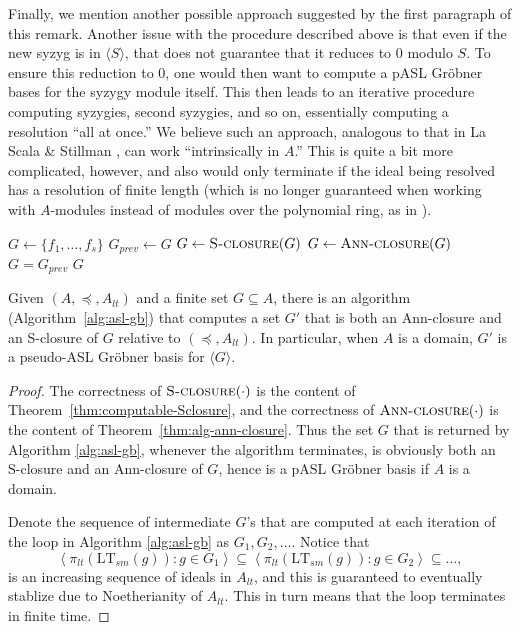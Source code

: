 \documentclass[11pt,reqno]{amsart}
\newcommand{\suchthat}{:}
\newcommand{\ideal}[1]{\left\langle#1\right\rangle}
\newcommand{\gb}{Gr\"{o}bner }
\newcommand{\ltsm}{\text{LT}_{sm}}
\theoremstyle{definition}
\numberwithin{equation}{section}
\begin{document}
\begin{remark}
Finally, we mention another possible approach suggested by the first paragraph of this remark. Another issue with the procedure described above is that even if the new syzyg is in $\langle S \rangle$, that does not guarantee that it reduces to $0$ modulo $S$. To ensure this reduction to $0$, one would then want to compute a pASL Gröbner bases for the syzygy module itself. This then leads to an iterative procedure computing syzygies, second syzygies, and so on, essentially computing a resolution ``all at once.'' We believe such an approach, analogous to that in La Scala \& Stillman \cite{LaScalaStillman}, can work ``intrinsically in $A$.'' This is quite a bit more complicated, however, and also would only terminate if the ideal being resolved has a resolution of finite length (which is no longer guaranteed when working with $A$-modules instead of modules over the polynomial ring, as in \cite{LaScalaStillman}). 
\end{remark}

\begin{algorithm}[h]
\caption{Computes a pseudo-ASL \gb of an ideal with respect to any $(A, \preceq, A_{lt})$}
\label{alg:asl-gb}
\begin{algorithmic}[1]
\medskip
{}
\State $G \gets \{f_1, \ldots, f_s\}$
\Repeat
\State $G_{prev} \gets G$
\State $G \gets \textsc{S-closure}(G)$
\State $G \gets \textsc{Ann-closure}(G)$
\Until $G = G_{prev}$
\State \Return $G$
\EndProcedure
\end{algorithmic}
\end{algorithm}

\begin{theorem} \label{thm:asl-gb-alt}
Given $(A,\preceq, A_{lt})$ and a finite set $G \subseteq A$, there is an algorithm (Algorithm~\ref{alg:asl-gb}) that computes a set $G'$ that is both an Ann-closure and an S-closure of $G$ relative to $(\preceq, A_{lt})$. In particular, when $A$ is a domain, $G'$ is a pseudo-ASL Gröbner basis for $\langle G \rangle$.
\end{theorem}

\begin{proof}
The correctness of $\textsc{S-closure}(\cdot)$ is the content of Theorem~\ref{thm:computable-Sclosure}, and the correctness of $\textsc{Ann-closure}(\cdot)$ is the content of Theorem~\ref{thm:alg-ann-closure}. Thus the set $G$ that is returned by Algorithm \ref{alg:asl-gb}, whenever the algorithm terminates, is obviously both an S-closure and an Ann-closure of $G$, hence is a pASL Gröbner basis if $A$ is a domain.

Denote the sequence of intermediate $G$'s that are computed at each iteration of the loop in Algorithm \ref{alg:asl-gb} as $G_1, G_2, \ldots$. Notice that 
\[\ideal{\pi_{lt}(\ltsm(g)) \suchthat g \in G_1} \subseteq \ideal{\pi_{lt}(\ltsm(g)) \suchthat g \in G_2} \subseteq \ldots,\] is an increasing sequence of ideals in $A_{lt}$, and this is guaranteed to eventually stablize due to Noetherianity of $A_{lt}$. This in turn means that the loop terminates in finite time.
\end{proof}
\end{document}
